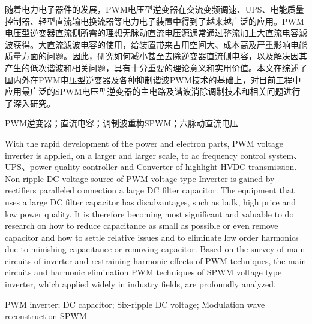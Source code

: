 \documentclass{NEEPU_THESIS}
\begin{document}

\newpage
\setcounter{page}{1}    %

\neepupagestylea
\begin{Abstractcn}
    随着电力电子器件的发展，PWM电压型逆变器在交流变频调速、UPS、电能质量控制器、轻型直流输电换流器等电力电子装置中得到了越来越广泛的应用。PWM电压型逆变器直流侧所需的理想无脉动直流电压源通常通过整流加上大直流电容滤波获得。大直流滤波电容的使用，给装置带来占用空间大、成本高及严重影响电能质量方面的问题。因此，研究如何减小甚至去除逆变器直流侧电容，以及解决因其产生的低次谐波和相关问题，具有十分重要的理论意义和实用价值。本文在综述了国内外在PWM电压型逆变器及各种抑制谐波PWM技术的基础上，对目前工程中应用最广泛的SPWM电压型逆变器的主电路及谐波消除调制技术和相关问题进行了深入研究。
\end{Abstractcn}
\begin{Keywordscn}
    PWM逆变器；直流电容；调制波重构SPWM；六脉动直流电压
\end{Keywordscn}

\newpage
\neepupagestylea
\begin{Abstracten}
    With the rapid development of the power and electron parts, PWM voltage inverter is applied, on a larger and larger scale, to ac frequency control system、UPS、power quality controller and Converter of highlight HVDC transmission. Non-ripple DC voltage source of PWM voltage type Inverter is gained by rectifiers paralleled connection a large DC filter capacitor. The equipment that uses a large DC filter capacitor has disadvantages, such as bulk, high price and low power quality. It is therefore becoming most significant and valuable to do research on how to reduce capacitance as small as possible or even remove capacitor and how to settle relative issues and to eliminate low order harmonics due to minishing capacitance or removing capacitor. Based on the survey of main circuits of inverter and restraining harmonic effects of PWM techniques, the main circuits and harmonic elimination PWM techniques of SPWM voltage type inverter, which applied widely in industry fields, are profoundly analyzed.
\end{Abstracten}
\begin{Keywordsen}
    {PWM inverter; DC capacitor; Six-ripple DC voltage; Modulation wave reconstruction SPWM}
\end{Keywordsen}
\newpage
\end{document}
